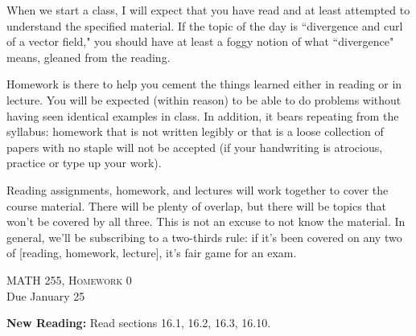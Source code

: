 \documentclass[12pt]{amsbook}
\begin{document}
When we start a class, I will expect that you have read and at least attempted to understand the specified material. If the topic of the day is ``divergence and curl of a vector field," you should have at least a foggy notion of what ``divergence" means, gleaned from the reading.

Homework is there to help you cement the things learned either in reading or in lecture. You will be expected (within reason) to be able to do problems without having seen identical examples in class. In addition, it bears repeating from the syllabus: homework that is not written legibly or that is a loose collection of papers with no staple will not be accepted (if your handwriting is atrocious, practice or type up your work).

Reading assignments, homework, and lectures will work together to cover the course material. There will be plenty of overlap, but there will be topics that won't be covered by all three. This is not an excuse to not know the material. In general, we'll be subscribing to a two-thirds rule: if it's been covered on any two of [reading, homework, lecture], it's fair game for an exam.

\pagebreak
\begin{center}
   \textsc{\large MATH 255, Homework 0}\\
   Due January 25
\end{center}
\vspace{.5cm}

\textbf{New Reading:} Read sections 16.1, 16.2, 16.3, 16.10.
\end{document}

